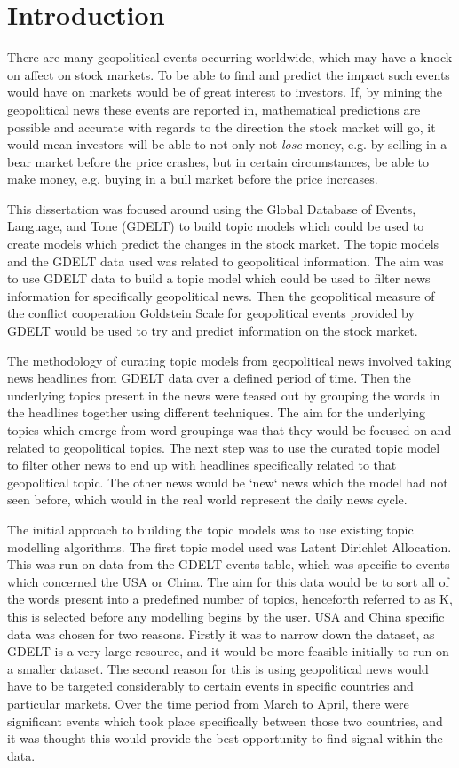 \section{Introduction}
There are many geopolitical events occurring worldwide, which may have a knock on affect on stock markets. To be able to find and predict the impact such events would have on markets would be of great interest to investors. If, by mining the geopolitical news these events are reported in, mathematical predictions are possible and accurate with regards to the direction the stock market will go, it would mean investors will be able to not only not \textit{lose} money, e.g. by selling in a bear market before the price crashes, but in certain circumstances, be able to make money, e.g. buying in a bull market before the price increases.

This dissertation was focused around using the Global Database of Events, Language, and Tone (GDELT) to build topic models which could be used to create models which predict the changes in the stock market. The topic models and the GDELT data used was related to geopolitical information. The aim was to use GDELT data to build a topic model which could be used to filter news information for specifically geopolitical news. Then the geopolitical measure of the conflict cooperation Goldstein Scale for geopolitical events provided by GDELT would be used to try and predict information on the stock market.

The methodology of curating topic models from geopolitical news involved taking news headlines from GDELT data over a defined period of time. Then the underlying topics present in the news were teased out by grouping the words in the headlines together using different techniques. The aim for the underlying topics which emerge from word groupings was that they would be focused on and related to geopolitical topics. The next step was to use the curated topic model to filter other news to end up with headlines specifically related to that geopolitical topic. The other news would be `new` news which the model had not seen before, which would in the real world represent the daily news cycle.

The initial approach to building the topic models was to use existing topic modelling algorithms. The first topic model used was Latent Dirichlet Allocation. This was run on data from the GDELT events table, which was specific to events which concerned the USA or China. The aim for this data would be to sort all of the words present into a predefined number of topics, henceforth referred to as K, this is selected before any modelling begins by the user. USA and China specific data was chosen for two reasons. Firstly it was to narrow down the dataset, as GDELT is a very large resource, and it would be more feasible initially to run on a smaller dataset. The second reason for this is using geopolitical news would have to be targeted considerably to certain events in specific countries and particular markets. Over the time period from March to April, there were significant events which took place specifically between those two countries, and it was thought this would provide the best opportunity to find signal within the data. 


